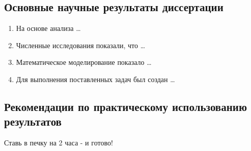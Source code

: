 
\subsection*{Основные научные результаты диссертации}

\begin{enumerate}
  \item На основе анализа \ldots
  \item Численные исследования показали, что \ldots
  \item Математическое моделирование показало \ldots
  \item Для выполнения поставленных задач был создан \ldots
\end{enumerate}

\subsection*{Рекомендации по практическому использованию результатов}

Ставь в печку на 2 часа - и готово!